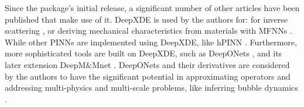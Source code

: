 \documentclass[pdflatex,sn-basic]{sn-jnl}%
\theoremstyle{thmstyleone}%
\theoremstyle{thmstyletwo}%
\theoremstyle{thmstylethree}%
\begin{document}
Since the package's initial release, a significant number of other articles have been published that make use of it.  %
DeepXDE is used by the authors for:
for inverse scattering \citep{Che2020_PhysicsInformedNeural_LuCLK}, or
 deriving mechanical characteristics from materials with MFNNs \citep{Lu2020_ExtractionMechanicalProperties_DaoLDK}.
While other PINNs are implemented using DeepXDE, like hPINN \citep{Kha2021_HpVpinnsVariational_ZhaKZK}.
Furthermore, more sophisticated tools are built on DeepXDE, such as
DeepONets  \citep{Lu2021_LearningNonlinearOperators_JinLJP}, and its later extension
DeepM\&Mnet \citep{Cai2021_DeepmmnetInferringElectroconvection_WanCWL, Mao2021_DeepmmnetHypersonicsPredicting_LuMLM}.
DeepONets and their derivatives
are considered by the authors to have the significant potential in approximating operators and addressing multi-physics and multi-scale problems, %
like inferring bubble dynamics
\citep{Lin2021_OperatorLearningPredicting_LiLLL, Lin2021_SeamlessMultiscaleOperator_MaxLMLK}.
%
\end{document}
